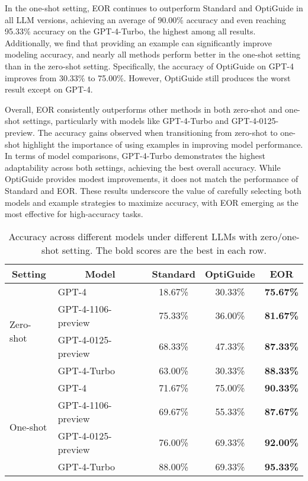 In the one-shot setting, EOR continues to outperform Standard and OptiGuide in all LLM versions, achieving an average of 90.00\% accuracy and even reaching 95.33\% accuracy on the GPT-4-Turbo, the highest among all results. Additionally, we find that providing an example can significantly improve modeling accuracy, and nearly all methods perform better in the one-shot setting than in the zero-shot setting. Specifically, the accuracy of OptiGuide on GPT-4 improves from 30.33\% to 75.00\%. However, OptiGuide still produces the worst result except on GPT-4.

Overall, EOR consistently outperforms other methods in both zero-shot and one-shot settings, particularly with models like GPT-4-Turbo and GPT-4-0125-preview. The accuracy gains observed when transitioning from zero-shot to one-shot highlight the importance of using examples in improving model performance. In terms of model comparisons, GPT-4-Turbo demonstrates the highest adaptability across both settings, achieving the best overall accuracy. While OptiGuide provides modest improvements, it does not match the performance of Standard and EOR. These results underscore the value of carefully selecting both models and example strategies to maximize accuracy, with EOR emerging as the most effective for high-accuracy tasks.
\begin{table}[t]
\caption{Accuracy across different models under different LLMs with zero/one-shot setting. The bold scores are the best in each row.}
\label{tab:results}
\vspace{-8pt}
\begin{center}
\begin{tabular}{l|l|c|c|c}
\toprule
\multicolumn{1}{c|}{Setting} & \multicolumn{1}{c|}{Model} & Standard & OptiGuide & EOR \\
\midrule
\multirow{4}{*}{Zero-shot}
    & GPT-4 & 18.67\% & 30.33\% & \textbf{75.67\%} \\
    & GPT-4-1106-preview & 75.33\% & 36.00\% & \textbf{81.67\%} \\
    & GPT-4-0125-preview & 68.33\% & 47.33\% & \textbf{87.33\%} \\
    & GPT-4-Turbo & 63.00\%& 30.33\% & \textbf{88.33\%} \\
\midrule
\multirow{4}{*}{One-shot}
    & GPT-4 & 71.67\% & 75.00\% & \textbf{90.33\%} \\
    & GPT-4-1106-preview & 69.67\% & 55.33\% & \textbf{87.67\%} \\
    & GPT-4-0125-preview & 76.00\% & 69.33\% & \textbf{92.00\%} \\
    & GPT-4-Turbo & 88.00\% & 69.33\% & \textbf{95.33\%} \\
\bottomrule
\end{tabular}
\end{center}
\vspace{-10pt}
\end{table}
